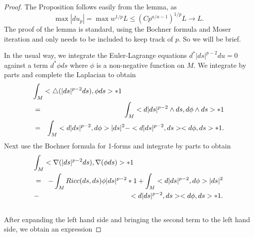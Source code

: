 \documentclass{ip-journal}
\theoremstyle{definition}
\numberwithin{equation}{section}
\begin{document}
\begin{proof}
The Proposition follows easily from the lemma, as
\[ 
\max |du_p| = \max w^{1/p}L \leq (Cp^{a/a-1})^{1/p} L \rightarrow L.
\]
The proof of the lemma is standard, using the Bochner formula and Moser iteration and only needs to be included to keep track of $p.$ So we will be brief. 

In the usual way, we integrate the Euler-Lagrange equations $d^*|ds|^{p-2}du = 0$ against a term $d^*\phi ds$ where $\phi$ is a non-negative function on $M.$ We integrate by parts and complete the Laplacian to obtain
\begin{eqnarray*}
\lefteqn{\int_M<\triangle (|ds|^{p-2}ds), \phi ds> *1}\\
&=&\int_M<d |ds|^{p-2} \wedge ds, d\phi \wedge ds>*1\\
&=&\int_M<d |ds|^{p-2}, d\phi> |ds|^2-<d |ds|^{p-2}, ds> <d\phi, ds>*1.
\end{eqnarray*}
Next use the Bochner formula for 1-forms and integrate by parts to obtain
\begin{eqnarray*}\label{myst1}
\lefteqn{\int_M<\nabla(|ds|^{p-2}ds), \nabla(\phi ds)>*1}\\
&=&-\int_M Ricc(ds,ds) \phi |ds|^{p-2}*1+\int_M<d |ds|^{p-2}, d\phi>  |ds|^2 \nonumber\\
&-&<d |ds|^{p-2}, ds> <d\phi, ds>*1.
\end{eqnarray*}
\\
After expanding the left hand side and bringing the second term to the left hand side, we obtain an expression
%
%
%
%

\end{proof}
\end{document}

